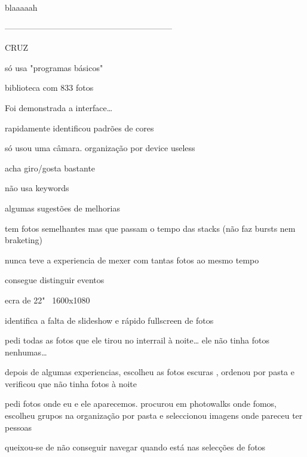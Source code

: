 blaaaaah


————————————————————

CRUZ

\begin{myitemize}

	\item * só usa "programas básicos"

	\item biblioteca com 833 fotos

	\item Foi demonstrada a interface…

	\item * rapidamente identificou padrões de cores

	\item só usou uma câmara. organização por device useless

	\item * acha giro/gosta bastante

	\item não usa keywords

	\item * algumas sugestões de melhorias

	\item tem fotos semelhantes mas que passam o tempo das stacks (não faz bursts nem braketing)

	\item * nunca teve a experiencia de mexer com tantas fotos ao mesmo tempo

	\item * consegue distinguir eventos

	\item ecra de 22" ~1600x1080

	\item * identifica a falta de slideshow e rápido fullscreen de fotos

	\item pedi todas as fotos que ele tirou no interrail à noite… ele não tinha fotos nenhumas…

	\item depois de algumas experiencias, escolheu as fotos escuras , ordenou por pasta e verificou que não tinha fotos à noite

	\item pedi fotos onde eu e ele aparecemos. procurou em photowalks onde fomos, escolheu grupos na organização por pasta e seleccionou imagens onde pareceu ter pessoas

	\item queixou-se de não conseguir navegar quando está nas selecções de fotos


\end{myitemize}

